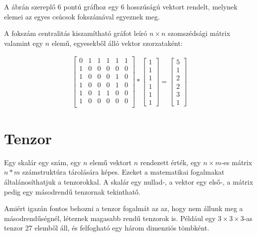 \documentclass[12pt,numbers=noenddot]{report}
\begin{document}
\vspace{0.5cm}

A ábrán szereplő 6 pontú gráfhoz egy 6 hosszúságú vektort rendelt, melynek elemei az egyes csúcsok fokszámával egyeznek meg.

A fokszám centralitás kiszamítható gráfot leíró $n \times n$ szomszédsági mátrix valamint egy $n$ elemű, egyesekből álló vektor szorzataként:

\begin{align}
	\begin{bmatrix}
		0 & 1 & 1 & 1 & 1 & 1 \\
		1 & 0 & 0 & 0 & 0 & 0 \\
		1 & 0 & 0 & 0 & 1 & 0 \\
		1 & 0 & 0 & 0 & 1 & 0 \\
		1 & 0 & 1 & 1 & 0 & 0 \\
		1 & 0 & 0 & 0 & 0 & 0 \\
	\end{bmatrix}
	*
	\begin{bmatrix}
		1\\
		1\\
		1\\
		1\\
		1\\
		1
	\end{bmatrix}
	=
	\begin{bmatrix}
		5\\
		1\\
		2\\
		2\\
		3\\
		1
	\end{bmatrix}
\end{align}


\section{Tenzor}

Egy skalár egy szám, egy $n$ elemű vektort $n$ rendezett érték, egy $n \times m$-es mátrix $n*m$ számstruktúra tárolására képes. 
Ezeket a matematikai fogalmakat általánosíthatjuk a tenzorokkal. 
A skalár egy nullad-, a vektor egy első-, a mátrix pedig egy másodrendű tenzornak tekinthatő.

Amiért igazán fontos behozni a tenzor fogalmát az az, hogy nem állunk meg a másodrendűségnél, léteznek magasabb rendű tenzorok is.
Például egy $3 \times 3 \times 3$-as tenzor 27 elemből áll, és felfogható egy három dimenziós tömbként.
\end{document}
